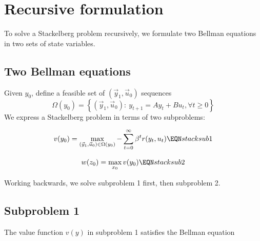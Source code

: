 \section{Recursive formulation}\label{recurstack}%
 To solve  a Stackelberg problem recursively,
 we formulate two Bellman equations in two sets of  state variables.

\subsection{Two Bellman equations}
Given $y_0$, define a feasible set of $(\vec y_1, \vec u_0)$ sequences
   $$
   \Omega(y_0) = \left\{ (\vec y_1, \vec u_0) : \ y_{t+1} = A y_t + B u_t, \forall t \geq 0 \right\} $$
We  express a Stackelberg problem in terms of  two subproblems:

\medskip
{}

$$   v(y_0) = \max_{(\vec y_1, \vec u_0) \in \Omega(y_0)} - \sum_{t=0}^\infty \beta^t r(y_t, u_t)
   \EQN stacksub1  $$


\medskip
{}

$$
   w(z_0) = \max_{x_0} v(y_0) \EQN stacksub2 $$

\noindent Working backwards, we solve subproblem 1 first, then subproblem 2.

\subsection{Subproblem 1}
The value function $v(y)$ in  subproblem 1 satisfies the Bellman equation

